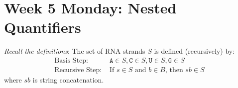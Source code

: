 \documentclass[12pt, oneside]{article}
\newcommand{\A}[0]{\texttt{A}}
\newcommand{\C}[0]{\texttt{C}}
\newcommand{\G}[0]{\texttt{G}}
\newcommand{\U}[0]{\texttt{U}}
\begin{document}

\section*{Week 5 Monday: Nested Quantifiers}


{\it Recall the definitions}: The set of RNA strands $S$ is defined (recursively) by:
\[
\begin{array}{ll}
\textrm{Basis Step: } & \A \in S, \C \in S, \U \in S, \G \in S \\
\textrm{Recursive Step: } & \textrm{If } s \in S\textrm{ and }b \in B \textrm{, then }sb \in S
\end{array}
\]
where $sb$ is string concatenation.
\end{document}
